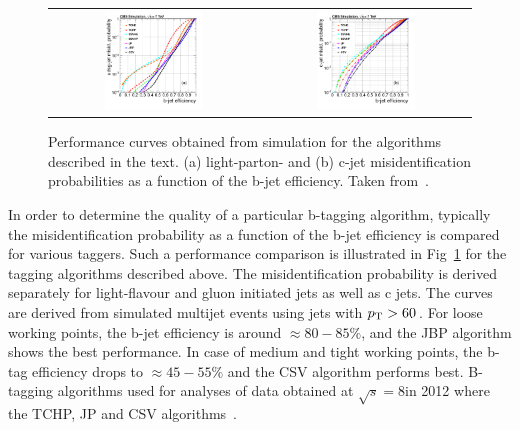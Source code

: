 \begin{figure}[!tp]
  \centering 
  \begin{tabular}{cc}
    \includegraphics[width=0.49\textwidth]{figures/figAlgo_Combined_udsgvsb_Efficienies.png} &
    \includegraphics[width=0.49\textwidth]{figures/figAlgo_Combined_cvsb_Efficienies.png} 
  \end{tabular}
  \caption{Performance curves obtained from simulation for the algorithms described in the text. (a) light-parton- and (b) c-jet misidentification probabilities as a function of the b-jet efficiency. Taken from~\cite{Chatrchyan:2012jua}.}
  \label{fig:btagging}
\end{figure}
In order to determine the quality of a particular b-tagging algorithm, typically the misidentification probability as a function of the b-jet efficiency is compared for various taggers. Such a performance comparison is illustrated in Fig~\ref{fig:btagging} for the tagging algorithms described above. The misidentification probability is derived separately for light-flavour and gluon initiated jets as well as c jets. The curves are derived from simulated multijet events using jets with $p_{\text{T}} > 60$\,\gev. For loose working points, the b-jet efficiency is around $\approx 80-85\%$, and the JBP algorithm shows the best performance. In case of medium and tight working points, the b-tag efficiency drops to $\approx 45-55\%$ and the CSV algorithm performs best. B-tagging algorithms used for analyses of data obtained at $\sqrt{s} = 8$\tev in 2012 where the TCHP, JP and CSV algorithms~\cite{CMS-PAS-BTV-13-001}. 

